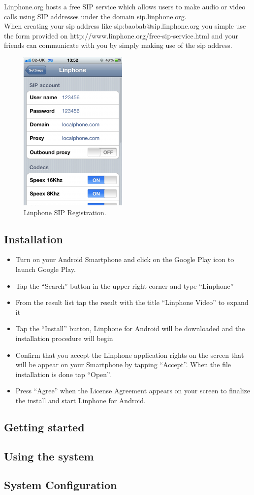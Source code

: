 \documentclass[a4paper]{article}
\begin{document}
Linphone.org hosts a free SIP service which allows users to make audio or video calls using SIP addresses under the domain sip.linphone.org. \\
When creating your sip address like sip:baobab@sip.linphone.org you simple use the form provided on http://www.linphone.org/free-sip-service.html and your friends can communicate with you by simply making use of the sip address.


\newpage
\begin{center}
\begin{figure}[h]
\centering
\includegraphics[width=0.4\linewidth]{./pictures/LinphoneSip.jpg}
\caption{\label{fig:Agile}Linphone SIP Registration.}
\end{figure}
\end{center}


\subsection{Installation}
\begin{itemize}
\item Turn on your Android Smartphone and click on the Google Play icon to launch Google Play.
\item Tap the “Search” button in the upper right corner and type “Linphone”
\item From the result list tap the result with the title “Linphone Video” to expand it
\item Tap the “Install” button, Linphone for Android will be downloaded and the installation procedure will begin
\item Confirm that you accept the Linphone application rights on the screen that will be appear on your Smartphone by tapping “Accept”. When the file installation is done tap “Open”.
\item Press “Agree” when the License Agreement appears on your screen to finalize the install and start Linphone for Android.
\end{itemize}

\subsection{Getting started}

\subsection{Using the system}

\subsection{System Configuration}
\end{document}
